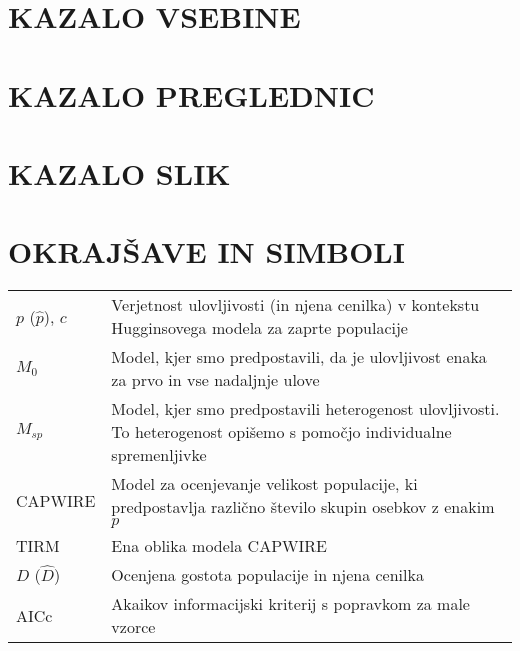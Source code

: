 \newpage

\renewcommand*{\contentsname}{}
\section*{\textbf{\large KAZALO VSEBINE}}
\vspace{-1.8cm}
\renewcommand{\baselinestretch}{0.8}\normalsize
\tableofcontents
\renewcommand{\baselinestretch}{1.0}\normalsize

\newpage
\normalsize
\renewcommand*\listtablename{}
\section*{\textbf{KAZALO PREGLEDNIC}}
\vspace{-1.5cm}
\listoftables

\newpage
\normalsize
\renewcommand*\listfigurename{} %
\section*{\textbf{KAZALO SLIK}} %
\vspace{-1cm}
\listoffigures

\newpage
\section*{OKRAJŠAVE IN SIMBOLI}

\begin{table}[H]
 \begin{tabular}{>{\raggedright} p{2cm} m{12cm}}
   $p$ ($\hat{p}$), $c$ & Verjetnost ulovljivosti (in njena cenilka) v kontekstu Hugginsovega modela za zaprte populacije \\
   $M_0$ & Model, kjer smo predpostavili, da je ulovljivost enaka za prvo in vse nadaljnje ulove \\
   $M_{sp}$ & Model, kjer smo predpostavili heterogenost ulovljivosti. To heterogenost opišemo s pomočjo individualne spremenljivke \\
   CAPWIRE & Model za ocenjevanje velikost populacije, ki predpostavlja različno število skupin osebkov z enakim $p$ \\
   TIRM & Ena oblika modela CAPWIRE \\
   $D$ ($\hat{D}$) & Ocenjena gostota populacije in njena cenilka \\
   AICc & Akaikov informacijski kriterij s popravkom za male vzorce \\
 \end{tabular}
\end{table}
\normalsize
